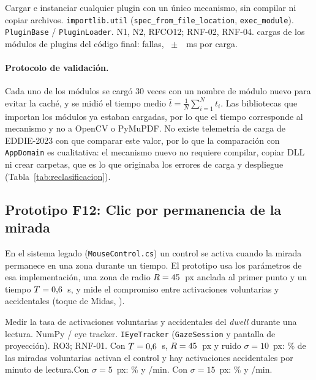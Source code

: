 {Cargar e instanciar cualquier plugin con un único mecanismo, sin compilar ni copiar archivos.}
{\texttt{importlib.util} (\texttt{spec\_from\_file\_location}, \texttt{exec\_module}).}
{\texttt{PluginBase} / \texttt{PluginLoader}.}
{N1, N2, RFCO12; RNF-02, RNF-04.}
{ \FOnceCargas{} cargas de los \FOnceModulos{} módulos de plugins del código final: \FOnceFallas{} fallas, \FOnceTiempoMs~$\pm$~\FOnceTiempoSdMs~ms por carga.}

\paragraph{Protocolo de validación.} Cada uno de los \FOnceModulos{} módulos se cargó 30 veces con un nombre de módulo nuevo para evitar la caché, y se midió el tiempo medio $\bar{t}=\frac{1}{N}\sum_{i=1}^{N}t_i$. Las bibliotecas que importan los módulos ya estaban cargadas, por lo que el tiempo corresponde al mecanismo y no a OpenCV o PyMuPDF. No existe telemetría de carga de EDDIE-2023 con que comparar este valor, por lo que la comparación con \texttt{AppDomain} es cualitativa: el mecanismo nuevo no requiere compilar, copiar DLL ni crear carpetas, que es lo que originaba los errores de carga y despliegue (Tabla~\ref{tab:reclasificacion}).

\subsection{Prototipo F12: Clic por permanencia de la mirada}

En el sistema legado (\texttt{MouseControl.cs}) un control se activa cuando la mirada permanece en una zona durante un tiempo. El prototipo usa los parámetros de esa implementación, una zona de radio $R=45$~px anclada al primer punto y un tiempo $T=0{,}6$~s, y mide el compromiso entre activaciones voluntarias y accidentales (toque de Midas, \citealp{jacob1990}).

{Medir la tasa de activaciones voluntarias y accidentales del \textit{dwell} durante una lectura.}
{NumPy / eye tracker.}
{\texttt{IEyeTracker} (\texttt{GazeSession} y pantalla de proyección).}
{RO3; RNF-01.}
{ Con $T=0{,}6$~s, $R=45$~px y ruido $\sigma=10$~px: \FDoceVoluntariasPct\% de las \FDoceMiradasVoluntarias{} miradas voluntarias activan el control y hay \FDoceAccidentalesPorMin{} activaciones accidentales por minuto de lectura.\newline Con $\sigma=5$~px: \FDoceVoluntariasRuidoBajoPct\% y \FDoceAccidentalesRuidoBajo{}/min. Con $\sigma=15$~px: \FDoceVoluntariasRuidoAltoPct\% y \FDoceAccidentalesRuidoAlto{}/min.}

